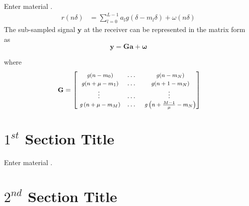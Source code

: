 {Enter material \cite{Zhang2004}.}
%
\begin{align}
\label{eq:TimeModel2a}
{r}(n \delta) &= {\sum_{l=0}^{L-1}a_l \mathit{g}(\delta - m_l \delta) + \omega(n \delta)}
\end{align}
%
The sub-sampled signal $\mathbf{y}$ at the receiver can be represented in the matrix form as
%
\begin{equation}
\label{eq:LinModel01}
\mathbf{y} = \mathbf{G} \mathbf{a} + \boldsymbol{\omega}
\end{equation}
%
{
where
%
\begin{equation}
\label{eq:P}
{\text{ \small $\mathbf{G}$}} = \left[
\begin{matrix}
\text{ \footnotesize $\mathit{g}(n-m_0)$}   & \ldots &   \text{ \footnotesize $\mathit{g}(n-m_N)$}\\
\text{ \footnotesize $\mathit{g}(n+{\mu}-m_1)$}   & \ldots &   \text{ \footnotesize $\mathit{g}(n+1-m_N)$}\\
\vdots             & \ldots &  \vdots      \\
\text{ \footnotesize $\mathit{g}\left(n+{\mu}-m_M\right)$} & \ldots &   \text{ \footnotesize $\mathit{g}\left(n+\frac{M-1}{\mu}-m_N\right)$}
\end{matrix} \right]
\end{equation}
%



\section{$1^{st}$ Section Title}
\label{yyyyy}

{Enter material \cite{Tesi2006}.}



\section{$2^{nd}$ Section Title}
\label{yyyyy}

}
